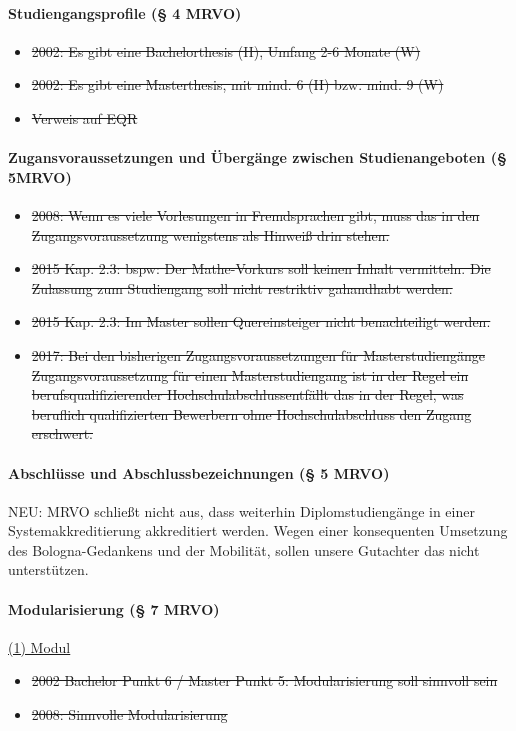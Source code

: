       \paragraph{Studiengangsprofile (§ 4 MRVO)}
        \begin{itemize}
          \item \sout{2002: Es gibt eine Bachelorthesis (H), Umfang 2-6 Monate (W)}
          \item \sout{2002: Es gibt eine Masterthesis, mit mind. 6 (H) bzw. mind. 9 (W)}
          \item \sout{Verweis auf EQR}
        \end{itemize}

      \paragraph{Zugansvoraussetzungen und Übergänge zwischen Studienangeboten (§ 5MRVO)}
        \begin{itemize}
          \item \sout{2008: Wenn es viele Vorlesungen in Fremdsprachen gibt, muss das in den Zugangsvoraussetzung wenigstens als Hinweiß drin stehen.}
          \item \sout{2015 Kap. 2.3: bspw: Der Mathe-Vorkurs soll keinen Inhalt vermitteln. Die Zulassung zum Studiengang soll nicht restriktiv gahandhabt werden.}
          \item \sout{2015 Kap. 2.3: Im Master sollen Quereinsteiger nicht benachteiligt werden.}
          \item \sout{2017: Bei den bisherigen Zugangsvoraussetzungen für Masterstudiengänge \flqq Zugangsvoraussetzung für einen Masterstudiengang ist in der Regel ein berufsqualifizierender Hochschulabschluss\frqq entfällt das \flqq in der Regel\frqq, was beruflich qualifizierten Bewerbern ohne Hochschulabschluss den Zugang erschwert.}
        \end{itemize}

      \paragraph{Abschlüsse und Abschlussbezeichnungen (§ 5 MRVO)}
        NEU: MRVO schließt nicht aus, dass weiterhin Diplomstudiengänge in einer Systemakkreditierung akkreditiert werden.
        Wegen einer konsequenten Umsetzung des Bologna-Gedankens und der Mobilität, sollen unsere Gutachter das nicht unterstützen.


      \paragraph{Modularisierung (§ 7 MRVO)}
        \underline{(1) Modul}
          \begin{itemize}
            \item \sout{2002 Bachelor Punkt 6 / Master Punkt 5: Modularisierung soll sinnvoll sein}
            \item \sout{2008: Sinnvolle Modularisierung}
          \end{itemize}

